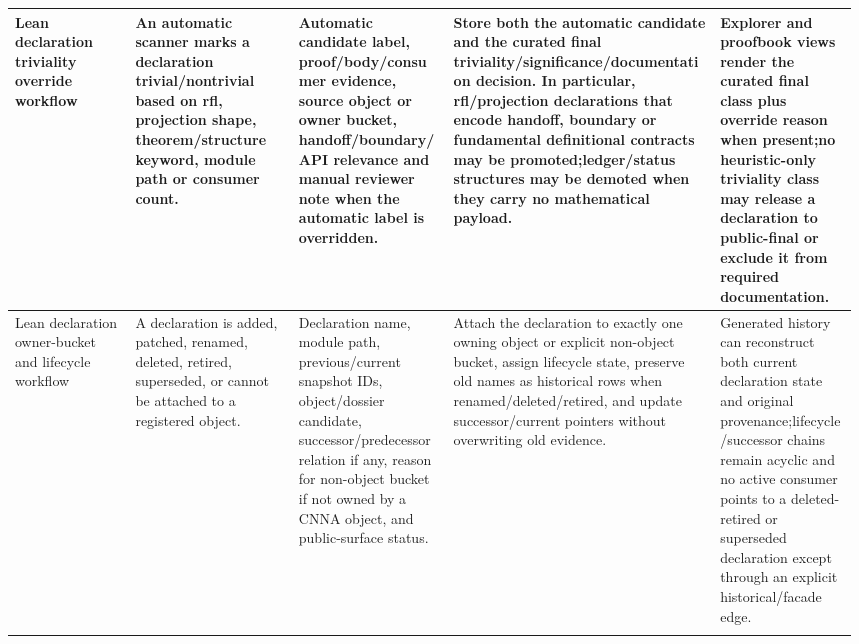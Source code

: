\begin{longtable}{L{0.14\linewidth} L{0.19\linewidth} L{0.18\linewidth} L{0.31\linewidth} L{0.16\linewidth}}
Lean declaration triviality override workflow & An automatic scanner marks a declaration trivial/\allowbreak{}nontrivial based on rfl, projection shape, theorem/\allowbreak{}structure keyword, module path or consumer count. & Automatic candidate label, proof/\allowbreak{}body/\allowbreak{}consumer evidence, source object or owner bucket, handoff/\allowbreak{}boundary/\allowbreak{}API relevance and manual reviewer note when the automatic label is overridden. & Store both the automatic candidate and the curated final triviality/\allowbreak{}significance/\allowbreak{}documentation decision. In particular, rfl/\allowbreak{}projection declarations that encode handoff, boundary or fundamental definitional contracts may be promoted;\newline ledger/\allowbreak{}status structures may be demoted when they carry no mathematical payload. & Explorer and proofbook views render the curated final class plus override reason when present;\newline no heuristic-only triviality class may release a declaration to public-final or exclude it from required documentation.\\
\hline
\addlinespace[0.24em]
Lean declaration owner-bucket and lifecycle workflow & A declaration is added, patched, renamed, deleted, retired, superseded, or cannot be attached to a registered object. & Declaration name, module path, previous/\allowbreak{}current snapshot IDs, object/\allowbreak{}dossier candidate, successor/\allowbreak{}predecessor relation if any, reason for non-object bucket if not owned by a CNNA object, and public-surface status. & Attach the declaration to exactly one owning object or explicit non-object bucket, assign lifecycle state, preserve old names as historical rows when renamed/\allowbreak{}deleted/\allowbreak{}retired, and update successor/\allowbreak{}current pointers without overwriting old evidence. & Generated history can reconstruct both current declaration state and original provenance;\newline lifecycle/\allowbreak{}successor chains remain acyclic and no active consumer points to a deleted-retired or superseded declaration except through an explicit historical/\allowbreak{}facade edge.\\
\hline
\addlinespace[0.24em]

\end{longtable}
